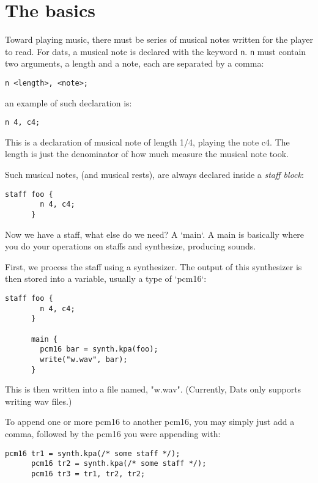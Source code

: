 \section{The basics}

\np Toward playing music, there must be series of musical notes written for the player to read.
For dats, a musical note is declared with the keyword \verb+n+. \verb+n+ must contain two arguments,
a length and a note, each are separated by a comma:


\begin{Verbatim}[frame=single]
       n <length>, <note>;
\end{Verbatim}


\np an example of such declaration is:
\begin{Verbatim}[frame=single]
       n 4, c4;
\end{Verbatim}

This is a declaration of musical note of length 1/4, playing the note c4. The length
is just the denominator of how much measure the musical note took.

\np Such musical notes, (and musical rests), are always declared inside a \textit{staff block}:

\begin{Verbatim}[frame=single]
      staff foo {
        n 4, c4;
      }
\end{Verbatim}

\np Now we have a staff, what else do we need? A `main`. A main is basically
where you do your operations on staffs and synthesize, producing sounds.

\np First, we process the staff using a synthesizer. The output of this synthesizer
is then stored into a variable, usually a type of `pcm16`:

\begin{Verbatim}[frame=single]
      staff foo {
        n 4, c4;
      }

      main {
        pcm16 bar = synth.kpa(foo);
        write("w.wav", bar);
      }
\end{Verbatim}

\np This is then written into a file named, "w.wav". (Currently, Dats only supports writing wav files.)

\np To append one or more pcm16 to another pcm16, you may simply just add a comma, followed by the pcm16
you were appending with:

\begin{Verbatim}[frame=single]
      pcm16 tr1 = synth.kpa(/* some staff */);
      pcm16 tr2 = synth.kpa(/* some staff */);
      pcm16 tr3 = tr1, tr2, tr2;
\end{Verbatim}
